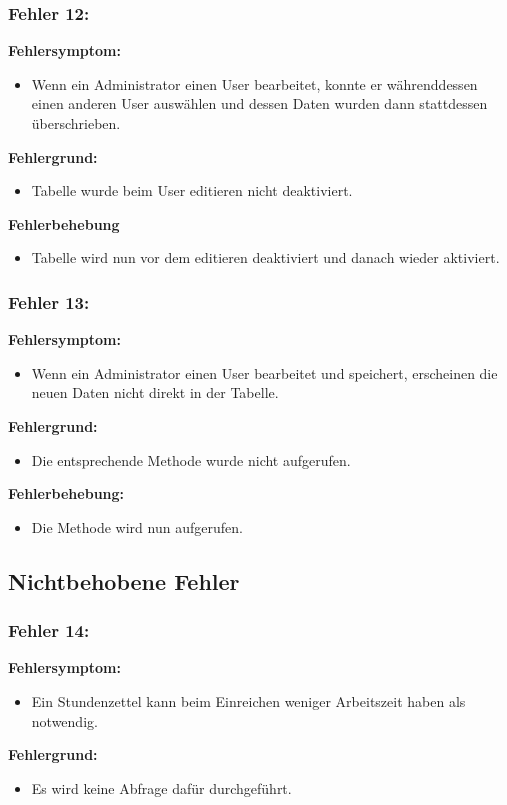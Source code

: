 \subsubsection{Fehler 12:}%
\textbf{Fehlersymptom:}
	\begin{itemize}
		\item Wenn ein Administrator einen User bearbeitet, konnte er währenddessen einen anderen User auswählen und dessen Daten wurden dann stattdessen überschrieben.
	\end{itemize}
\textbf{Fehlergrund:}
	\begin{itemize}
		\item Tabelle wurde beim User editieren nicht deaktiviert.
	\end{itemize}
\textbf{Fehlerbehebung}
	\begin{itemize}
		\item Tabelle wird nun vor dem editieren deaktiviert und danach wieder aktiviert.
	\end{itemize}
	
\subsubsection{Fehler 13:}%
\textbf{Fehlersymptom:}
	\begin{itemize}
		\item Wenn ein Administrator einen User bearbeitet und speichert, erscheinen die neuen Daten nicht direkt in der Tabelle.
	\end{itemize}
\textbf{Fehlergrund:}
	\begin{itemize}
		\item Die entsprechende Methode wurde nicht aufgerufen.
	\end{itemize}
\textbf{Fehlerbehebung:}
	\begin{itemize}
		\item Die Methode wird nun aufgerufen.
	\end{itemize}
	
\newpage

\subsection{Nichtbehobene Fehler}

\subsubsection{Fehler 14:}%
\textbf{Fehlersymptom:}
	\begin{itemize}
		\item Ein Stundenzettel kann beim Einreichen weniger Arbeitszeit haben als notwendig.
	\end{itemize}
\textbf{Fehlergrund:}
	\begin{itemize}
		\item Es wird keine Abfrage dafür durchgeführt.
	\end{itemize}
	
